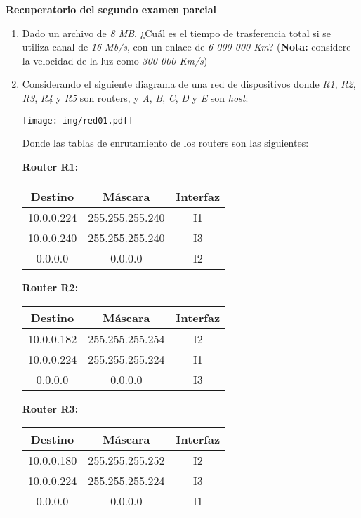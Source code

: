 \documentclass[12pt]{article}
\def\maketitle{

\makeatletter
{\color{bl} \centering \huge \sc \textbf{Recuperatorio del segundo examen
\mbox{parcial}}}
\makeatother

\makeatletter


}
\begin{document}
\thispagestyle{empty}
\maketitle
\setlength{\parindent}{1pt}

\begin{enumerate}

    \item Dado un archivo de \emph{8 MB}, ¿Cuál es el tiempo de trasferencia
        total si se utiliza canal de \emph{16 Mb/s}, con un enlace de \emph{6
        000 000 Km}? (\textbf{Nota: } considere la velocidad de la luz como
        \emph{300 000 Km/s})

    \item Considerando el siguiente diagrama de una red de dispositivos donde
        \emph{R1}, \emph{R2}, \emph{R3}, \emph{R4} y \emph{R5} son routers, y
        \emph{A}, \emph{B}, \emph{C}, \emph{D} y \emph{E} son \emph{host}:

    \texttt{[image: img/red01.pdf]}

    Donde las tablas de enrutamiento de los routers son las siguientes:

    \textbf{Router R1: }
    \begin{tabular}{|c|c|c|}
        \hline
        Destino & Máscara & Interfaz \\
        \hline
        10.0.0.224 & 255.255.255.240 & I1 \\
        \hline
        10.0.0.240 & 255.255.255.240 & I3 \\
        \hline
        0.0.0.0 & 0.0.0.0 & I2 \\
        \hline
    \end{tabular}

    \textbf{Router R2: }
    \begin{tabular}{|c|c|c|}
        \hline
        Destino & Máscara & Interfaz \\
        \hline
        10.0.0.182 & 255.255.255.254 & I2 \\
        \hline
        10.0.0.224 & 255.255.255.224 & I1 \\
        \hline
        0.0.0.0 & 0.0.0.0 & I3 \\
        \hline
    \end{tabular}

    \textbf{Router R3: }
    \begin{tabular}{|c|c|c|}
        \hline
        Destino & Máscara & Interfaz \\
        \hline
        10.0.0.180 & 255.255.255.252 & I2 \\
        \hline
        10.0.0.224 & 255.255.255.224 & I3 \\
        \hline
        0.0.0.0 & 0.0.0.0 & I1 \\
        \hline
    \end{tabular}


\end{enumerate}
\end{document}
